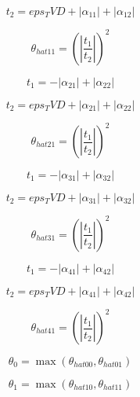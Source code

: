 \documentclass{article}
\begin{document}
\begin{dmath}t_{2} = eps_TVD + \left|{\alpha_{11}}\right| + \left|{\alpha_{12}}\right|\end{dmath}

\begin{dmath}\theta_{hat 11} = \left(\left|{\frac{t_{1}}{t_{2}}}\right| \right)^{2}\end{dmath}

\begin{dmath}t_{1} = - \left|{\alpha_{21}}\right| + \left|{\alpha_{22}}\right|\end{dmath}

\begin{dmath}t_{2} = eps_TVD + \left|{\alpha_{21}}\right| + \left|{\alpha_{22}}\right|\end{dmath}

\begin{dmath}\theta_{hat 21} = \left(\left|{\frac{t_{1}}{t_{2}}}\right| \right)^{2}\end{dmath}

\begin{dmath}t_{1} = - \left|{\alpha_{31}}\right| + \left|{\alpha_{32}}\right|\end{dmath}

\begin{dmath}t_{2} = eps_TVD + \left|{\alpha_{31}}\right| + \left|{\alpha_{32}}\right|\end{dmath}

\begin{dmath}\theta_{hat 31} = \left(\left|{\frac{t_{1}}{t_{2}}}\right| \right)^{2}\end{dmath}

\begin{dmath}t_{1} = - \left|{\alpha_{41}}\right| + \left|{\alpha_{42}}\right|\end{dmath}

\begin{dmath}t_{2} = eps_TVD + \left|{\alpha_{41}}\right| + \left|{\alpha_{42}}\right|\end{dmath}

\begin{dmath}\theta_{hat 41} = \left(\left|{\frac{t_{1}}{t_{2}}}\right| \right)^{2}\end{dmath}

\begin{dmath}\theta_{0} = \max\left(\theta_{hat 00}, \theta_{hat 01}\right)\end{dmath}

\begin{dmath}\theta_{1} = \max\left(\theta_{hat 10}, \theta_{hat 11}\right)\end{dmath}
\end{document}
